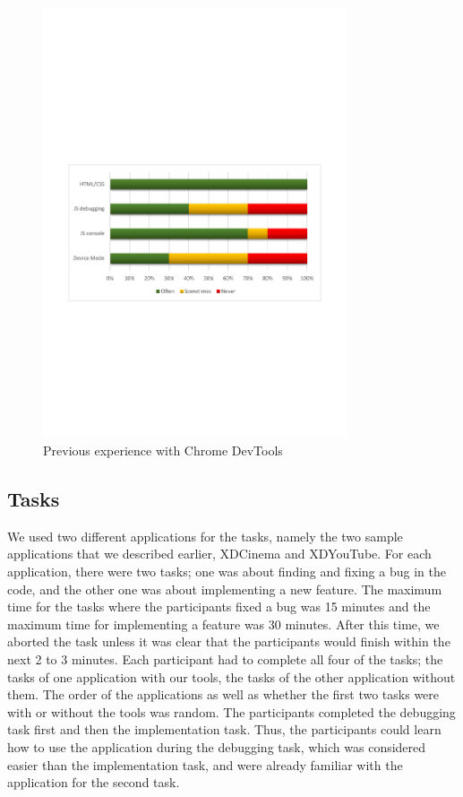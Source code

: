 \begin{figure}[H]
  \centering
    \includegraphics[width=0.8\textwidth]{images/charts/devtools_xp.pdf}
	\caption[Previous experience with Chrome DevTools]{Previous experience with Chrome DevTools}
	\label{fig:devtools_xp}
\end{figure}

\subsection{Tasks}

We used two different applications for the tasks, namely the two sample applications that we described earlier, XDCinema and XDYouTube. For each application, there were two tasks; one was about finding and fixing a bug in the code, and the other one was about implementing a new feature. The maximum time for the tasks where the participants fixed a bug was 15 minutes and the maximum time for implementing a feature was 30 minutes. After this time, we aborted the task unless it was clear that the participants would finish within the next 2 to 3 minutes. Each participant had to complete all four of the tasks; the tasks of one application with our tools, the tasks of the other application without them. The order of the applications as well as whether the first two tasks were with or without the tools was random. The participants completed the debugging task first and then the implementation task. Thus, the participants could learn how to use the application during the debugging task, which was considered easier than the implementation task, and were already familiar with the application for the second task.

